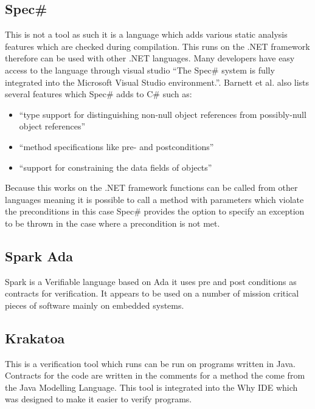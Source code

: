 \documentclass[a4paper,12pt]{scrartcl}
\begin{document}
{		\subsection{\texorpdfstring{Spec\#}{}}
		{
			This is not a tool as such it is a language which adds various static analysis features which are checked during compilation. This runs on the .NET framework therefore can be used with other .NET languages. Many developers have easy access to the language through visual studio \enquote{The Spec\# system is fully integrated into the Microsoft Visual Studio environment.}\cite{Barnett2005}. Barnett et al. also lists several features which Spec\# adds to C\# such as:
			\begin{itemize}
				\item{\enquote{type support for distinguishing non-null object references from possibly-null object references}\cite{Barnett2005}}
				\item{\enquote{method specifications like pre- and postconditions}\cite{Barnett2005}}
				\item{\enquote{support for constraining the data fields of objects}\cite{Barnett2005}}
			\end{itemize}
			Because this works on the .NET framework functions can be called from other languages meaning it is possible to call a method with parameters which violate the preconditions in this case Spec\# provides the option to specify an exception to be thrown in the case where a precondition is not met.
		}
		\subsection{Spark Ada}
		{
			Spark is a Verifiable language based on Ada it uses pre and post conditions as contracts for verification. It appears to be used on a number of mission critical pieces of software mainly on embedded systems. 
		}
		\subsection{Krakatoa \cite{Marche2018,Filliatre2007}}\label{sec:krakatoa}
		{
			This is a verification tool which runs can be run on programs written in Java. Contracts for the code are written in the comments for a method the come from the Java Modelling Language\cite{Burdy2004}. This tool is integrated into the Why IDE which was designed to make it easier to verify programs.
		}
		
	}
\end{document}
